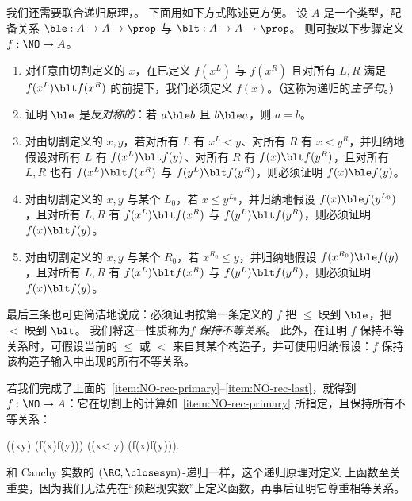 

我们还需要联合递归原理，。
下面用如下方式陈述更方便。
设 $A$ 是一个类型，配备关系 $\mathord\ble:A\to A\to\prop$ 与 $\mathord\blt:A\to A\to\prop$。
则可按以下步骤定义 $f:\NO\to A$。
\begin{enumerate}
\item 对任意由切割定义的 $x$，在已定义 $f(x^L)$ 与 $f(x^R)$ 且对所有 $L,R$ 满足 $f(x^L)\blt f(x^R)$ 的前提下，我们必须定义 $f(x)$。（这称为递归的\emph{主子句}。）\label{item:NO-rec-primary}
\item 证明 $\ble$ 是\emph{反对称的}：若 $a\ble b$ 且 $b\ble a$，则 $a=b$。
\item 对由切割定义的 $x,y$，若对所有 $L$ 有 $x^L<y$、对所有 $R$ 有 $x<y^R$，并归纳地假设对所有 $L$ 有 $f(x^L)\blt f(y)$、对所有 $R$ 有 $f(x)\blt f(y^R)$，且对所有 $L,R$ 也有 $f(x^L)\blt f(x^R)$ 与 $f(y^L)\blt f(y^R)$，则必须证明 $f(x)\ble f(y)$。
\item 对由切割定义的 $x,y$ 与某个 $L_0$，若 $x\le y^{L_0}$，并归纳地假设 $f(x)\ble f(y^{L_0})$，且对所有 $L,R$ 有 $f(x^L)\blt f(x^R)$ 与 $f(y^L)\blt f(y^R)$，则必须证明 $f(x)\blt f(y)$。
\item 对由切割定义的 $x,y$ 与某个 $R_0$，若 $x^{R_0}\le y$，并归纳地假设 $f(x^{R_0})\ble f(y)$，且对所有 $L,R$ 有 $f(x^L)\blt f(x^R)$ 与 $f(y^L)\blt f(y^R)$，则必须证明 $f(x)\blt f(y)$。\label{item:NO-rec-last}
\end{enumerate}
最后三条也可更简洁地说成：必须证明按第一条定义的 $f$ 把 $\le$ 映到 $\ble$，把 $<$ 映到 $\blt$。
我们将这一性质称为\emph{$f$ 保持不等关系}。
此外，在证明 $f$ 保持不等关系时，可假设当前的 $\le$ 或 $<$ 来自其某个构造子，并可使用归纳假设：$f$ 保持该构造子输入中出现的所有不等关系。

若我们完成了上面的~\ref{item:NO-rec-primary}--\ref{item:NO-rec-last}，就得到 $f:\NO\to A$：它在切割上的计算如~\ref{item:NO-rec-primary} 所指定，且保持所有不等关系：
%
\begin{narrowmultline*}
  \Big((x\le y) \to (f(x)\ble f(y))\Big) \land
  \narrowbreak
  \Big((x< y) \to (f(x)\blt f(y))\Big).
\end{narrowmultline*}
%
和 Cauchy 实数的 $(\RC,\closesym)$-递归一样，这个递归原理对定义 \NO 上函数至关重要，因为我们无法先在“预超现实数”上定义函数，再事后证明它尊重相等关系。

